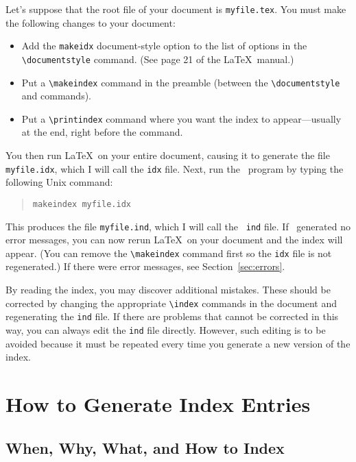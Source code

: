 Let's suppose that the root file of your document is {\tt myfile.tex}.
You must make the following changes to your document:
\begin{itemize}

\item Add the {\tt makeidx} document-style option to the list of
options in the \verb|\documentstyle| command.  (See page 21 of the
\LaTeX\ manual.)

\item Put a \verb|\makeindex| command in the preamble (between the 
  \linebreak%
\verb|\documentstyle| and \verb|| commands).

\item Put a \verb|\printindex| command where you want the index to
appear---usually at the end, right before the \verb||
command.
\end{itemize}
You then run \LaTeX\ on your entire document, causing it to
generate the file {\tt myfile.idx}, which I will call the {\tt idx} file.
Next, run the \MakeIndex\ program by
typing the following Unix command:
\begin{quote}
    {\tt makeindex myfile.idx}
\end{quote}
This produces the file {\tt myfile.ind}, which I will call the {\tt
ind} file.  If \MakeIndex\ generated no error messages, you can now rerun
\LaTeX\ on your document and the index will appear.  (You can remove
the \verb|\makeindex| command first so the {\tt idx} file is not
regenerated.)  If there were error messages, see
Section~\ref{sec:errors}.

By reading the index, you may discover additional mistakes.  These should be
corrected by changing the appropriate \verb|\index| commands in the
document and regenerating the {\tt ind} file.  If there are
problems that cannot be corrected in this way, you can always edit 
the {\tt ind} file directly.  However, such editing is to be
avoided because it must be repeated every time you generate a new
version of the index.


\section{How to Generate Index Entries}

\subsection{When, Why, What, and How to Index}

